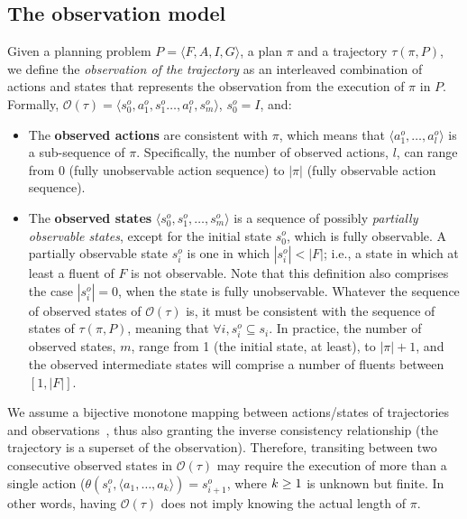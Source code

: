 \documentclass[letterpaper]{article} %
\newcommand{\tup}[1]{{\langle #1 \rangle}}
\begin{document}
\subsection{The observation model}
Given a planning problem $P=\tup{F,A,I,G}$, a plan $\pi$ and a trajectory $\tau(\pi,P)$, we define the \emph{observation of the trajectory} as an interleaved combination of actions and states that represents the observation from the execution of $\pi$ in $P$. Formally, $\mathcal{O}(\tau)=\tup{s_0^o,a_1^o,s_1^o \ldots , a_l^o, s_m^o}$, $s_0^o=I$, and:


\begin{itemize}
\item The {\bf observed actions} are consistent with $\pi$, which means that $\tup{a_1^o, \ldots, a_l^o}$ is a sub-sequence of $\pi$. Specifically, the number of observed actions, $l$, can range from $0$ (fully unobservable action sequence) to $|\pi|$ (fully observable action sequence).
\item The {\bf observed states} $\tup{s_0^o, s_1^o, \ldots, s_m^o}$ is a sequence of possibly {\em partially observable states}, except for the initial state $s_0^o$, which is fully observable. A partially observable state $s_i^o$ is one in which $|s_i^o| < |F|$; i.e., a state in which at least a fluent of $F$ is not observable. Note that this definition also comprises the case $|s_i^o| = 0$, when the state is fully unobservable. Whatever the sequence of observed states of $\mathcal{O}(\tau)$ is, it must be consistent with the sequence of states of $\tau(\pi,P)$, meaning that $\forall i, s_i^o \subseteq s_i$. In practice, the number of observed states, $m$, range from 1 (the initial state, at least), to $|\pi|+1$, and the observed intermediate states will comprise a number of fluents between $[1,|F|]$.
\end{itemize}

We assume a bijective monotone mapping between actions/states of trajectories and observations~\cite{ramirez2009plan}, thus also granting the inverse consistency relationship (the trajectory is a superset of the observation). Therefore, transiting between two consecutive observed states in $\mathcal{O}(\tau)$ may require the execution of more than a single action ($\theta(s_i^o,\tup{a_1,\ldots,a_k})=s_{i+1}^o$, where ${\small k\geq 1}$ is unknown but finite. In other words, having $\mathcal{O}(\tau)$ does not imply knowing the actual length of $\pi$.
\end{document}

